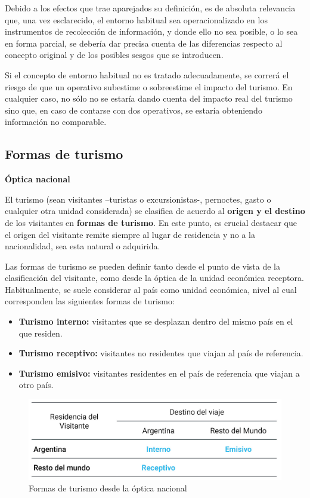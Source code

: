 \documentclass[
]{book}
\begin{document}
Debido a los efectos que trae aparejados su definición, es de absoluta relevancia que, una vez esclarecido, el entorno habitual sea operacionalizado en los instrumentos de recolección de información, y donde ello no sea posible, o lo sea en forma parcial, se debería dar precisa cuenta de las diferencias respecto al concepto original y de los posibles sesgos que se introducen.

Si el concepto de entorno habitual no es tratado adecuadamente, se correrá el riesgo de que un operativo subestime o sobreestime el impacto del turismo. En cualquier caso, no sólo no se estaría dando cuenta del impacto real del turismo sino que, en caso de contarse con dos operativos, se estaría obteniendo información no comparable.

\hypertarget{formas-de-turismo}{%
\subsection{Formas de turismo}\label{formas-de-turismo}}

\textbf{Óptica nacional}

El turismo (sean visitantes --turistas o excursionistas-, pernoctes, gasto o cualquier otra unidad considerada) se clasifica de acuerdo al \textbf{origen y el destino} de los visitantes en \textbf{formas de turismo}. En este punto, es crucial destacar que el origen del visitante remite siempre al lugar de residencia y no a la nacionalidad, sea esta natural o adquirida.

Las formas de turismo se pueden definir tanto desde el punto de vista de la clasificación del visitante, como desde la óptica de la unidad económica receptora. Habitualmente, se suele considerar al país como unidad económica, nivel al cual corresponden las siguientes formas de turismo:

\begin{itemize}
\item
  \textbf{Turismo interno:} visitantes que se desplazan dentro del mismo país en el que residen.
\item
  \textbf{Turismo receptivo:} visitantes no residentes que viajan al país de referencia.
\item
  \textbf{Turismo emisivo:} visitantes residentes en el país de referencia que viajan a otro país.
\end{itemize}

\begin{figure}

{\centering \includegraphics[width=0.8\linewidth]{imagenes/figura1.3} 

}

\caption{Formas de turismo desde la óptica nacional}\label{fig:nacional}
\end{figure}
\end{document}
